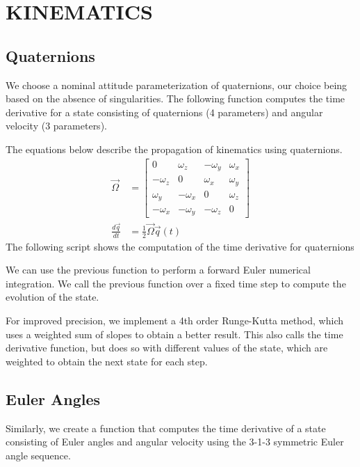 \section{\Large KINEMATICS}
\subsection{Quaternions}
We choose a nominal attitude parameterization of quaternions, our choice being based on the absence of singularities. The following function computes the time derivative for a state consisting of quaternions (4 parameters) and angular velocity (3 parameters).

The equations below describe the propagation of kinematics using quaternions.
\begin{align*}
\Vec{\Omega} &= 
    \begin{bmatrix}
    0 & \omega_{z} & -\omega_{y} & \omega_{x}\\
    -\omega_{z} & 0 & \omega_{x} & \omega_{y}\\
    \omega_{y} & -\omega_{x} & 0 & \omega_{z}\\
    -\omega_{x} & -\omega_{y} & -\omega_{z} & 0
    \end{bmatrix}\\
\frac{d \Vec{q}}{dt} &= \frac{1}{2} \Vec{\Omega} \Vec{q}(t)
\end{align*}
The following script shows the computation of the time derivative for quaternions



We can use the previous function to perform a forward Euler numerical integration. We call the previous function over a fixed time step to compute the evolution of the state.



For improved precision, we implement a 4th order Runge-Kutta method, which uses a weighted sum of slopes to obtain a better result. This also calls the time derivative function, but does so with different values of the state, which are weighted to obtain the next state for each step.

\subsection{Euler Angles}
Similarly, we create a function that computes the time derivative of a state consisting of Euler angles and angular velocity using the 3-1-3 symmetric Euler angle sequence.

